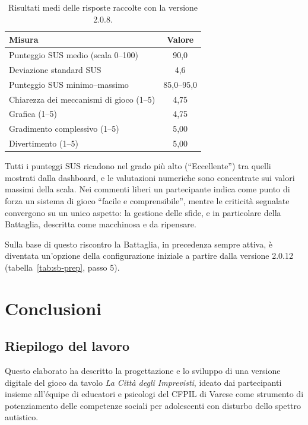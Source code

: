 \documentclass[12pt]{report}
\begin{document}
\begin{table}[h]
    \centering
    \begin{tabular}{|l|c|}
    \hline
    \textbf{Misura} & \textbf{Valore} \\ \hline
    Punteggio SUS medio (scala 0--100) & 90,0 \\ \hline
    Deviazione standard SUS & 4,6 \\ \hline
    Punteggio SUS minimo--massimo & 85,0--95,0 \\ \hline
    Chiarezza dei meccanismi di gioco (1--5) & 4,75 \\ \hline
    Grafica (1--5) & 4,75 \\ \hline
    Gradimento complessivo (1--5) & 5,00 \\ \hline
    Divertimento (1--5) & 5,00 \\ \hline
    \end{tabular}
    \caption{Risultati medi delle risposte raccolte con la versione 2.0.8.}
    \label{tab:risultati-preliminari}
\end{table}

Tutti i punteggi SUS ricadono nel grado più alto (``Eccellente'') tra quelli mostrati dalla dashboard, e le valutazioni numeriche sono concentrate sui valori massimi della scala. Nei commenti liberi un partecipante indica come punto di forza un sistema di gioco ``facile e comprensibile'', mentre le criticità segnalate convergono su un unico aspetto: la gestione delle sfide, e in particolare della Battaglia, descritta come macchinosa e da ripensare.

Sulla base di questo riscontro la Battaglia, in precedenza sempre attiva, è diventata un'opzione della configurazione iniziale a partire dalla versione 2.0.12 (tabella~\ref{tab:sb-prep}, passo 5).

%
% 

\chapter{Conclusioni}
\label{cap:conclusioni}

\section{Riepilogo del lavoro}

Questo elaborato ha descritto la progettazione e lo sviluppo di una versione digitale del gioco da tavolo \textit{La Città degli Imprevisti}, ideato dai partecipanti insieme all'équipe di educatori e psicologi del CFPIL di Varese come strumento di potenziamento delle competenze sociali per adolescenti con disturbo dello spettro autistico.
\end{document}
